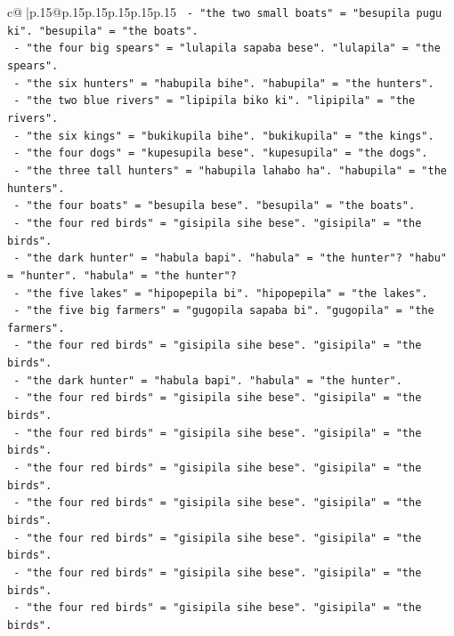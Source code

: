 \documentclass{article}
\begin{document}
{\begin{supertabular}{c@{$\;$}|p{.15\linewidth}@{}p{.15\linewidth}p{.15\linewidth}p{.15\linewidth}p{.15\linewidth}p{.15\linewidth}}
{{{\texttt{  {-} "the two small boats" = "besupila pugu ki". "besupila" = "the boats".} \\
\texttt{  {-} "the four big spears" = "lulapila sapaba bese". "lulapila" = "the spears".} \\
\texttt{  {-} "the six hunters" = "habupila bihe". "habupila" = "the hunters".} \\
\texttt{  {-} "the two blue rivers" = "lipipila biko ki". "lipipila" = "the rivers".} \\
\texttt{  {-} "the six kings" = "bukikupila bihe". "bukikupila" = "the kings".} \\
\texttt{  {-} "the four dogs" = "kupesupila bese". "kupesupila" = "the dogs".} \\
\texttt{  {-} "the three tall hunters" = "habupila lahabo ha". "habupila" = "the hunters".} \\
\texttt{  {-} "the four boats" = "besupila bese". "besupila" = "the boats".} \\
\texttt{  {-} "the four red birds" = "gisipila sihe bese". "gisipila" = "the birds".} \\
\texttt{  {-} "the dark hunter" = "habula bapi". "habula" = "the hunter"? "habu" = "hunter". "habula" = "the hunter"?} \\
\texttt{  {-} "the five lakes" = "hipopepila bi". "hipopepila" = "the lakes".} \\
\texttt{  {-} "the five big farmers" = "gugopila sapaba bi". "gugopila" = "the farmers".} \\
\texttt{  {-} "the four red birds" = "gisipila sihe bese". "gisipila" = "the birds".} \\
\texttt{  {-} "the dark hunter" = "habula bapi". "habula" = "the hunter".} \\
\texttt{  {-} "the four red birds" = "gisipila sihe bese". "gisipila" = "the birds".} \\
\texttt{  {-} "the four red birds" = "gisipila sihe bese". "gisipila" = "the birds".} \\
\texttt{  {-} "the four red birds" = "gisipila sihe bese". "gisipila" = "the birds".} \\
\texttt{  {-} "the four red birds" = "gisipila sihe bese". "gisipila" = "the birds".} \\
\texttt{  {-} "the four red birds" = "gisipila sihe bese". "gisipila" = "the birds".} \\
\texttt{  {-} "the four red birds" = "gisipila sihe bese". "gisipila" = "the birds".} \\
\texttt{  {-} "the four red birds" = "gisipila sihe bese". "gisipila" = "the birds".} \\
}}}
\end{supertabular}}
\end{document}
